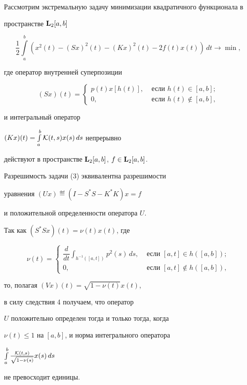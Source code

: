 \begin{exam}


Рассмотрим экстремальную задачу минимизации квадратичного функционала в


пространстве ${\bold L}_2[a,b]$


\begin{equation}


\frac12\int\limits_a^b\left(x^2(t)-(Sx)^2(t)-(Kx)^2(t)-2f(t)x(t)\right)\,dt


\longrightarrow\min,


\end{equation}


где оператор внутренней суперпозиции


$$


(Sx)(t)=


\begin{cases}


p(t)x[h(t)], &\text{ если }h(t)\in[a,b];\\


0, & \text{ если }h(t)\notin[a,b],


\end{cases}


$$


и интегральный оператор


$(Kx)(t)=\int\limits_a^b{\cal K}(t,s)x(s)\,ds$ непрерывно


действуют в пространстве ${\bold L}_2[a,b]$, $f\in{\bold L}_2[a,b]$.


Разрешимость задачи (3) эквивалентна разрешимости


уравнения $(Ux)\eqdef(I-S^*S-K^*K)x=f$


и положительной определенности оператора $U$.


Так как $(S^*Sx)(t)= \nu(t)x(t)$, где


$$


\nu(t)=


\begin{cases}


\dfrac d{dt}\displaystyle\int_{h^{-1}([a,t])}p^2(s)\,ds,&


\text{ если }[a,t]\in h([a,b]);\\


0, & \text{ если }[a,t]\notin h([a,b]),


\end{cases}


$$


то, полагая $(Vx)(t)=\sqrt{1-\nu(t)}x(t)$, 


в силу следствия 4 получаем, что оператор


$U$ положительно определен тогда и только тогда, когда


$\nu(t)\le1$ на $[a,b]$, и норма интегрального оператора


$\int\limits_a^b\frac{{\cal K}(t,s)}{\sqrt{1-\nu(s)}}x(s)\,ds$


не превосходит единицы.


\end{exam}








